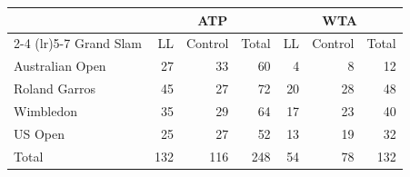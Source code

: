 \begin{tabular}{l rrr rrr}
\toprule
 & \multicolumn{3}{c}{ATP} & \multicolumn{3}{c}{WTA} \\
\cmidrule(lr){2-4} \cmidrule(lr){5-7}
Grand Slam & LL & Control & Total & LL & Control & Total \\
\midrule
Australian Open & 27 & 33 & 60 & 4 & 8 & 12 \\
Roland Garros & 45 & 27 & 72 & 20 & 28 & 48 \\
Wimbledon & 35 & 29 & 64 & 17 & 23 & 40 \\
US Open & 25 & 27 & 52 & 13 & 19 & 32 \\
\midrule
Total & 132 & 116 & 248 & 54 & 78 & 132 \\
\bottomrule
\end{tabular}
